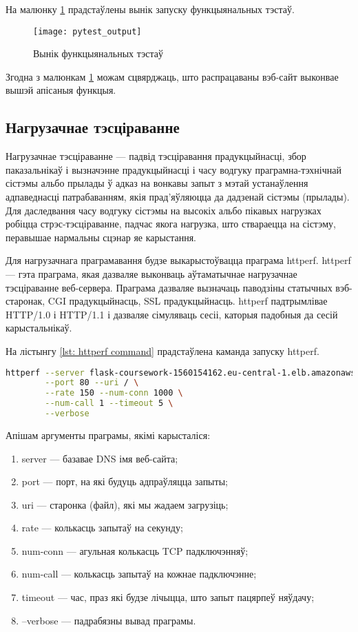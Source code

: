 На малюнку \ref{img: pytest output} прадстаўлены вынік запуску функцыянальных тэстаў.
\begin{figure}[h!]
    \centering
    \texttt{[image: pytest\_output]}
    \caption{Вынік функцыянальных тэстаў}
    \label{img: pytest output} 
\end{figure}

Згодна з малюнкам \ref{img: pytest output} можам сцвярджаць, што распрацаваны вэб-сайт
выконвае вышэй апісаныя функцыя.

\subsection{Нагрузачнае тэсціраванне}

Нагрузачнае тэсціраванне --- падвід тэсціравання прадукцыйнасці, збор паказальнікаў і вызначэнне
прадукцыйнасці і часу водгуку праграмна-тэхнічнай сістэмы альбо прылады ў адказ на вонкавы запыт
з мэтай устанаўлення адпаведнасці патрабаванням, якія прад'яўляюцца да дадзенай сістэмы (прылады).
Для даследвання часу водгуку сістэмы на высокіх альбо пікавых нагрузках робіцца стрэс-тэсціраванне,
падчас якога нагрузка, што ствараецца на сістэму, перавышае нармальны сцэнар яе карыстання.

Для нагрузачнага праграмавання будзе выкарыстоўвацца праграма httperf.
httperf --- гэта праграма, якая дазваляе выконваць аўтаматычнае нагрузачнае тэсціраванне веб-сервера.
Праграма дазваляе вызначаць паводзіны статычных вэб-старонак, CGI прадукцыйнасць, SSL прадукцыйнасць.
httperf падтрымлівае HTTP/1.0 і HTTP/1.1 і дазваляе сімуляваць сесіі, каторыя падобныя да сесій карыстальнікаў.

На лістынгу \ref{lst: httperf command} прадстаўлена каманда запуску httperf.

\begin{lstlisting}[language=bash,caption={Каманда запуску праграмы httperf},label={lst: httperf command}]
httperf --server flask-coursework-1560154162.eu-central-1.elb.amazonaws.com \
        --port 80 --uri / \
        --rate 150 --num-conn 1000 \
        --num-call 1 --timeout 5 \
        --verbose
\end{lstlisting}

Апішам аргументы праграмы, якімі карысталіся:
\begin{enumerate}
    \item server --- базавае DNS імя веб-сайта;
    \item port --- порт, на які будуць адпраўляцца запыты;
    \item uri --- старонка (файл), які мы жадаем загрузіць;
    \item rate --- колькасць запытаў на секунду;
    \item num-conn --- агульная колькасць TCP падключэнняў;
    \item num-call --- колькасць запытаў на кожнае падключэнне;
    \item timeout --- час, праз які будзе лічыцца, што запыт пацярпеў няўдачу;
    \item --verbose --- падрабязны вывад праграмы.
\end{enumerate}


